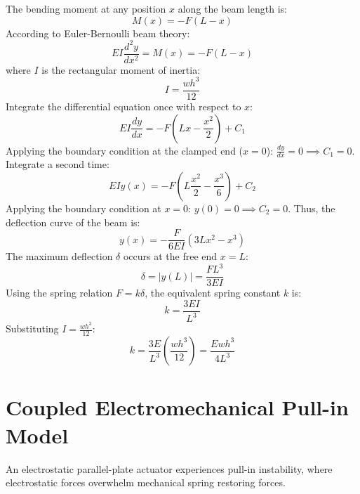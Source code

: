 \documentclass[12pt,a4paper]{article}
\begin{document}
The bending moment at any position $x$ along the beam length is:
$$M(x) = -F(L-x)$$
According to Euler-Bernoulli beam theory:
$$E I \frac{d^2 y}{dx^2} = M(x) = -F(L-x)$$
where $I$ is the rectangular moment of inertia:
$$I = \frac{w h^3}{12}$$
Integrate the differential equation once with respect to $x$:
$$E I \frac{dy}{dx} = -F \left(L x - \frac{x^2}{2}\right) + C_1$$
Applying the boundary condition at the clamped end ($x = 0$): $\frac{dy}{dx} = 0 \implies C_1 = 0$.
Integrate a second time:
$$E I y(x) = -F \left(L \frac{x^2}{2} - \frac{x^3}{6}\right) + C_2$$
Applying the boundary condition at $x = 0$: $y(0) = 0 \implies C_2 = 0$.
Thus, the deflection curve of the beam is:
$$y(x) = -\frac{F}{6 E I} (3 L x^2 - x^3)$$
The maximum deflection $\delta$ occurs at the free end $x = L$:
$$\delta = |y(L)| = \frac{F L^3}{3 E I}$$
Using the spring relation $F = k \delta$, the equivalent spring constant $k$ is:
$$k = \frac{3 E I}{L^3}$$
Substituting $I = \frac{w h^3}{12}$:
$$k = \frac{3 E}{L^3} \left(\frac{w h^3}{12}\right) = \frac{E w h^3}{4 L^3}$$

\section{Coupled Electromechanical Pull-in Model}

An electrostatic parallel-plate actuator experiences pull-in instability, where electrostatic forces overwhelm mechanical spring restoring forces.
\end{document}

